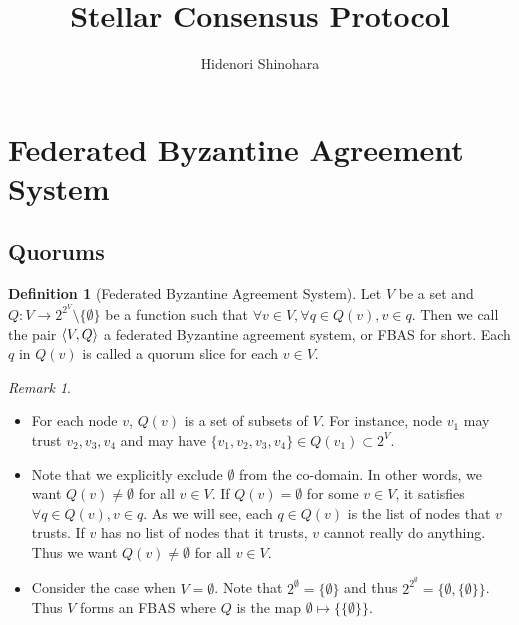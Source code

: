 \documentclass[12pt, psamsfonts]{amsart}
\theoremstyle{definition}
\newtheorem{defn}[thm]{Definition}
\theoremstyle{remark}
\newtheorem{rem}[thm]{Remark}
\numberwithin{equation}{subsection}
\begin{document}
\title{Stellar Consensus Protocol}
\author{Hidenori Shinohara}

\maketitle

\tableofcontents
\pagebreak

\section{Federated Byzantine Agreement System}

\subsection{Quorums}

\begin{defn}[Federated Byzantine Agreement System]
    Let $V$ be a set and $Q:V \rightarrow 2^{2^V} \setminus \{ \emptyset \}$ be a function such that $\forall v \in V, \forall q \in Q(v), v \in q$.
    Then we call the pair $\ev{V, Q}$ a federated Byzantine agreement system, or FBAS for short.
    Each $q$ in $Q(v)$ is called a quorum slice for each $v \in V$.
\end{defn}

\begin{rem}
    $ $
    \begin{itemize}
        \item
            For each node $v$, $Q(v)$ is a set of subsets of $V$.
            For instance, node $v_1$ may trust $v_2, v_3, v_4$ and may have $\{ v_1, v_2, v_3, v_4 \} \in Q(v_1) \subset 2^V$.
        \item
            Note that we explicitly exclude $\emptyset$ from the co-domain.
            In other words, we want $Q(v) \ne \emptyset$ for all $v \in V$.
            If $Q(v) = \emptyset$ for some $v \in V$, it satisfies $\forall q \in Q(v), v \in q$.
            As we will see, each $q \in Q(v)$ is the list of nodes that $v$ trusts.
            If $v$ has no list of nodes that it trusts, $v$ cannot really do anything.
            Thus we want $Q(v) \ne \emptyset$ for all $v \in V$.
        \item
            Consider the case when $V = \emptyset$.
            Note that $2^\emptyset = \{ \emptyset \}$ and thus $2^{2^\emptyset} = \{ \emptyset, \{ \emptyset \} \}$.
            Thus $V$ forms an FBAS where $Q$ is the map $\emptyset \mapsto \{ \{ \emptyset \} \}$.
    \end{itemize}
\end{rem}
\end{document}
